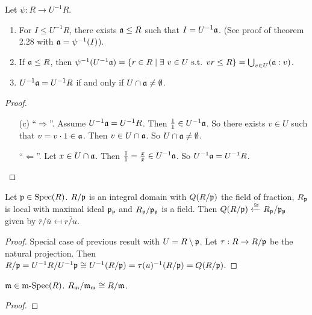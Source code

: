 \begin{proposition}
    Let $\psi: R \to U^{-1}R$.
    \begin{enumerate}
        \item For $I \leq U^{-1}R$, there exists $\mathfrak{a} \leq R$ such that $I = U^{-1}\mathfrak{a}$. (See proof of theorem 2.28 with $\mathfrak{a} = \psi^{-1}(I)$).
        \item If $\mathfrak{a} \leq R$, then $\psi^{-1}(U^{-1}\mathfrak{a}) =\{r \in R \mid \exists \  v \in U \text{ s.t. }v r \leq R\} = \bigcup_{v \in U} (\mathfrak{a}:v)$.
        \item $U^{-1}\mathfrak{a} = U^{-1}R$ if and only if $U \cap \mathfrak{a} \neq \emptyset$.
    \end{enumerate}
\end{proposition}

\begin{proof}
    \begin{enumerate}
        \item [(c)]
            ``$\Rightarrow$''. Assume $U^{-1}\mathfrak{a} = U^{-1}R$. Then $\frac{1}{1} \in U^{-1}\mathfrak{a}$. So there exists $v \in U$ such that $v = v \cdot 1 \in \mathfrak{a}$. Then $v \in U \cap \mathfrak{a}$. So $U \cap \mathfrak{a} \neq \emptyset$. \par 
            ``$\Leftarrow$''. Let $x \in U \cap \mathfrak{a}$. Then $\frac{1}{1} = \frac{x}{x} \in U^{-1}\mathfrak{a}$. So $U^{-1}\mathfrak{a} = U^{-1}R$.
    \end{enumerate}
\end{proof}

\begin{corollary}
    Let $\mathfrak{p} \in \operatorname{Spec}(R)$. $R/\mathfrak{p}$ is an integral domain with $Q(R/\mathfrak{p})$ the field of fraction, $R_{\mathfrak{p}}$ is local with maximal ideal $\mathfrak{p}_{\mathfrak{p}}$ and $R_{\mathfrak{p}}/\mathfrak{p}_{\mathfrak{p}}$ is a field. Then $Q(R/\mathfrak{p}) \xleftarrow \cong R_{\mathfrak{p}}/\mathfrak{p}_{\mathfrak{p}}$ given by $\overbar r / \overbar u \mapsfrom \overbar {r/u}$.
\end{corollary}

\begin{proof}
    Special case of previous result with $U = R \setminus \mathfrak{p}$. Let $\tau: R \to R/\mathfrak{p}$ be the natural projection. Then $R/\mathfrak{p} = U^{-1}R/U^{-1}\mathfrak{p} \cong U^{-1}(R/\mathfrak{p}) = \tau(u)^{-1}(R/\mathfrak{p}) = Q(R/\mathfrak{p})$.
\end{proof}

\begin{corollary}
    $\mathfrak{m} \in \operatorname{m-Spec}(R)$. $R_{\mathfrak{m}}/\mathfrak{m}_{\mathfrak{m}} \cong R/\mathfrak{m}$.
\end{corollary}

\begin{proof}

\end{proof}

